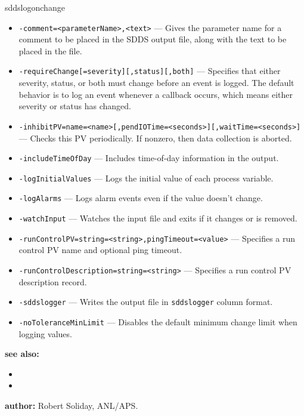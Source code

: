 \begin{sddsprog}{sddslogonchange}
\begin{itemize}
  \item {\tt -comment=<parameterName>,<text>} --- Gives the parameter name for a comment to be placed in the SDDS output file, along with the text to be placed in the file.
  \item {\tt -requireChange[=severity][,status][,both]} --- Specifies that either severity, status, or both must change before an event is logged.  The default behavior is to log an event whenever a callback occurs, which means either severity or status has changed.
  \item {\tt -inhibitPV=name=<name>[,pendIOTime=<seconds>][,waitTime=<seconds>]} --- Checks this PV periodically.  If nonzero, then data collection is aborted.
  \item {\tt -includeTimeOfDay} --- Includes time-of-day information in the output.
  \item {\tt -logInitialValues} --- Logs the initial value of each process variable.
  \item {\tt -logAlarms} --- Logs alarm events even if the value doesn't change.
  \item {\tt -watchInput} --- Watches the input file and exits if it changes or is removed.
  \item {\tt -runControlPV=string=<string>,pingTimeout=<value>} --- Specifies a run control PV name and optional ping timeout.
  \item {\tt -runControlDescription=string=<string>} --- Specifies a run control PV description record.
  \item {\tt -sddslogger} --- Writes the output file in \verb+sddslogger+ column format.
  \item {\tt -noToleranceMinLimit} --- Disables the default minimum change limit when logging values.
\end{itemize}

\item \textbf{see also:}
\begin{itemize}
  \item {}
  \item {}
\end{itemize}
\item \textbf{author:} Robert Soliday, ANL/APS.
\end{sddsprog}
